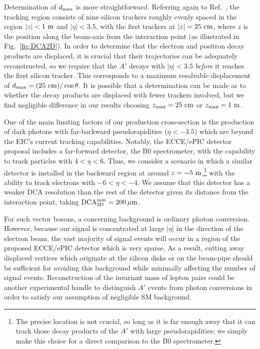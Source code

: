 Determination of $d_{\rm max}$ is more straightforward. Referring again to Ref.~\cite{Adkins:2022jfp}, the tracking region consists of nine silicon trackers roughly evenly spaced in the region $|z| < 1~{\rm m}$ and $|\eta| < 3.5$, with the first trackers at $|z| = 25~{\rm cm}$, where $z$ is the position along the beam-axis from the interaction point (as illustrated in Fig.~\ref{fig:DCA2D}). In order to determine that the electron and positron decay products are displaced, it is crucial that their trajectories can be adequately reconstructed, so we require that the $A'$ decays with $|\eta| < 3.5$ {\it before} it reaches the first silicon tracker. This corresponds to a maximum resolvable displacement of $d_{\rm max} = (25~{\rm cm})/\cos{\theta}$. It is possible that a determination can be made as to whether the decay products are displaced with fewer trackers involved, but we find negligible difference in our results choosing $z_{\rm max} = 25~{\rm cm}$ or $z_{\rm max} = 1~{\rm m}$. 

One of the main limiting factors of our production cross-section is the production of dark photons with far-backward pseudorapidities ($\eta < -3.5$) which are beyond the EIC's current tracking capabilities. Notably, the ECCE/ePIC detector proposal includes a far-forward detector, the B0 spectrometer, with the capability to track particles with $4 < \eta < 6$. Thus, we consider a scenario in which a similar detector is installed in the backward region at around $z = -5~{\rm m}$,\footnote{The precise location is not crucial, so long as it is far enough away that it can track those decay products of the $A'$ with large pseudorapidities; we simply make this choice for a direct comparison to the B0 spectrometer.} with the ability to track electrons with $-6 < \eta < -4$. We assume that this detector has a weaker DCA resolution than the rest of the detector given its distance from the interaction point, taking ${\rm DCA}_{\rm 2D}^{\rm min} = 200\,\mu{\rm m}$.

For such vector bosons, a concerning background is ordinary photon conversion. However, because our signal is concentrated at large $|\eta|$ in the direction of the electron beam, the vast majority of signal events will occur in a region of the proposed ECCE/ePIC detector which is very sparse. As a result, cutting away displaced vertices which originate at the silicon disks or on the beam-pipe should be sufficient for avoiding this background while minimally affecting the number of signal events. Reconstruction of the invariant mass of lepton pairs could be another experimental handle to distinguish $A'$ events from photon conversions in order to satisfy our assumption of negligible SM background.

